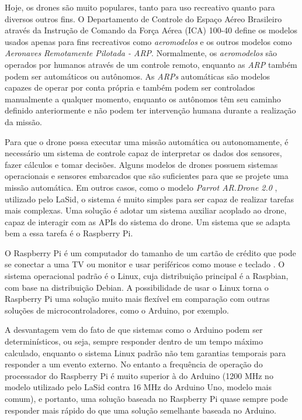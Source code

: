 Hoje, os drones são muito populares, tanto para uso recreativo quanto para diversos outros fins. O Departamento de Controle do Espaço Aéreo Brasileiro através da Instrução de Comando da Força Aérea (ICA) 100-40 \cite{CEA2018} define os modelos usados apenas para fins recreativos como \textit{aeromodelos} e os outros modelos como \textit{Aeronaves Remotamente Pilotada - ARP}. Normalmente, os \textit{aeromodelos} são operados por humanos através de um controle remoto, enquanto as \textit{ARP} também podem ser automáticos ou autônomos. As \textit{ARPs} automáticas são modelos capazes de operar por conta própria e também podem ser controlados manualmente a qualquer momento, enquanto os autônomos têm seu caminho definido anteriormente e não podem ter intervenção humana durante a realização da missão.

Para que o drone possa executar uma missão automática ou autonomamente, é necessário um sistema de controle capaz de interpretar os dados dos sensores, fazer cálculos e tomar decisões. Alguns modelos de drones possuem sistemas operacionais e sensores embarcados que são suficientes para que se projete uma missão automática. Em outros casos, como o modelo \textit{Parrot AR.Drone 2.0} \cite{Parrot2019a}, utilizado pelo LaSid, o sistema é muito simples para ser capaz de realizar tarefas mais complexas. Uma solução é adotar um sistema auxiliar acoplado ao drone, capaz de interagir com as APIs do sistema do drone. Um sistema que se adapta bem a essa tarefa é o Raspberry Pi.

O Raspberry Pi é um computador do tamanho de um cartão de crédito que pode se conectar a uma TV ou monitor e usar periféricos como mouse e teclado \cite{RPF2019}. O sistema operacional padrão é o Linux, cuja distribuição principal é a Raspbian, com base na distribuição Debian. A possibilidade de usar o Linux torna o Raspberry Pi uma solução muito mais flexível em comparação com outras soluções de microcontroladores, como o Arduino, por exemplo.

A desvantagem vem do fato de que sistemas como o Arduino podem ser determinísticos, ou seja, sempre responder dentro de um tempo máximo calculado, enquanto o sistema Linux padrão não tem garantias temporais para responder a um evento externo. No entanto a frequência de operação do processador do Raspberry Pi é muito superior à do Arduino (1200 MHz no modelo utilizado pelo LaSid contra 16 MHz do Arduino Uno, modelo mais comum), e portanto, uma solução baseada no Raspberry Pi quase sempre pode responder mais rápido do que uma solução semelhante baseada no Arduino.

